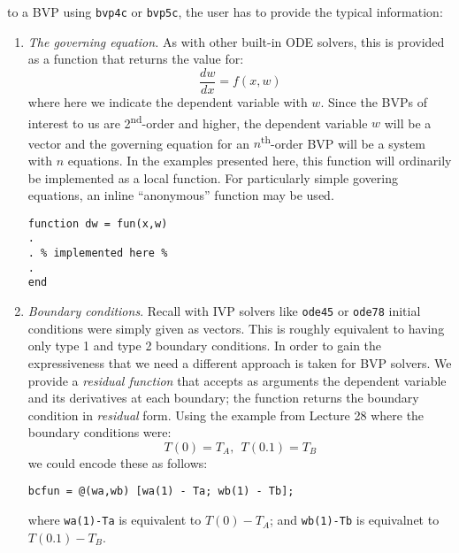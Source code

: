  to a BVP using \lstinline[style=myMatlab]{bvp4c} or \lstinline[style=myMatlab]{bvp5c}, the user has to provide the typical information:
\begin{enumerate}
\item \emph{The governing equation.} As with other built-in ODE solvers, this is provided as a function that returns the value for:
\begin{equation*}
\frac{dw}{dx} = f(x,w)
\end{equation*}
where here we indicate the dependent variable with $w$.  Since the BVPs of interest to us are 2\textsuperscript{nd}-order and higher, the dependent variable $w$ will be a vector and the governing equation for an $n$\textsuperscript{th}-order BVP will be a system with $n$ equations.  In the examples presented here, this function will ordinarily be implemented as a local function.  For particularly simple govering equations, an inline ``anonymous'' function may be used.
\begin{lstlisting}[style=myMatlab]
function dw = fun(x,w)
.
. % implemented here %
.
end
\end{lstlisting}

\item \emph{Boundary conditions}.  Recall with IVP solvers like \lstinline[style=myMatlab]{ode45} or \lstinline[style=myMatlab]{ode78} initial conditions were simply given as vectors.  This is roughly equivalent to having only type 1 and type 2 boundary conditions.  In order to gain the expressiveness that we need a different approach is taken for BVP solvers.  We provide a \emph{residual function} that accepts as arguments the dependent variable and its derivatives at each boundary; the function returns the boundary condition in \emph{residual} form.  Using the example from Lecture 28 where the boundary conditions were:
\begin{equation*}
T(0) = T_A, \ \ T(0.1) = T_B
\end{equation*}
we could encode these as follows:
\begin{lstlisting}[style=myMatlab]
bcfun = @(wa,wb) [wa(1) - Ta; wb(1) - Tb];
\end{lstlisting}
where \lstinline[style=myMatlab]{wa(1)-Ta} is equivalent to $T(0)-T_A$; and \lstinline[style=myMatlab]{wb(1)-Tb} is equivalnet to $T(0.1)-T_B$.


\end{enumerate}
